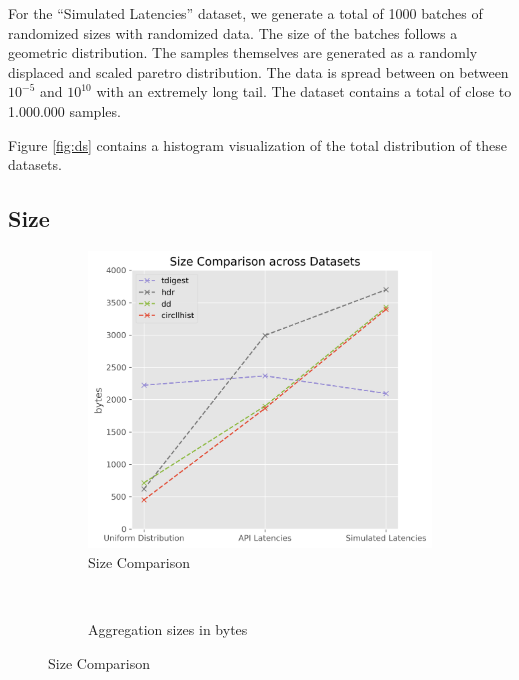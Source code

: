 \documentclass{article}
\theoremstyle{plain}
\theoremstyle{remark}
\begin{document}
For the ``Simulated Latencies'' dataset, we generate a total of 1000 batches of randomized sizes
with randomized data.  The size of the batches follows a geometric distribution.  The samples
themselves are generated as a randomly displaced and scaled paretro distribution.  The data is
spread between on between $10^{-5}$ and $10^{10}$ with an extremely long tail.  The dataset contains
a total of close to 1.000.000 samples.

Figure \ref{fig:ds} contains a histogram visualization of the total distribution of these datasets.

\subsection{Size}

\begin{figure}
    \centering
    \begin{subfigure}[b]{0.3\textwidth}
      \includegraphics[width=\textwidth]{evaluation/images/all_size_line.png}
      \caption{Size Comparison}
      \label{fig:size}
    \end{subfigure}
    ~ %
    \begin{subfigure}[b]{0.6\textwidth}
      
      \caption{Aggregation sizes in bytes}
      \label{fig:tsize}
    \end{subfigure}
    \caption{Size Comparison}
\end{figure}
\end{document}

